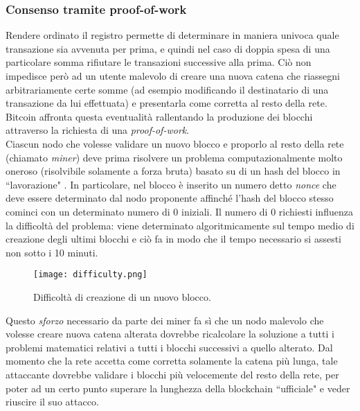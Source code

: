 		\subsubsection{Consenso tramite proof-of-work}
			Rendere ordinato il registro permette di determinare in maniera univoca quale transazione sia avvenuta per prima, e quindi nel caso di doppia spesa di una particolare somma rifiutare le transazioni successive alla prima. Ciò non impedisce però ad un utente malevolo di creare una nuova catena che riassegni arbitrariamente certe somme (ad esempio modificando il destinatario di una transazione da lui effettuata) e presentarla come corretta al resto della rete. Bitcoin affronta questa eventualità rallentando la produzione dei blocchi attraverso la richiesta di una \emph{proof-of-work}. \\
			Ciascun nodo che volesse validare un nuovo blocco e proporlo al resto della rete (chiamato \emph{miner}) deve prima risolvere un problema computazionalmente molto oneroso (risolvibile solamente a forza bruta) basato su di un hash del blocco in ``lavorazione" \cite{hashcash}. In particolare, nel blocco è inserito un numero detto \emph{nonce} che deve essere determinato dal nodo proponente affinché l'hash del blocco stesso cominci con un determinato numero di 0 iniziali. Il numero di 0 richiesti influenza la difficoltà del problema: viene determinato algoritmicamente sul tempo medio di creazione degli ultimi blocchi e ciò fa in modo che il tempo necessario si assesti non sotto i 10 minuti.
			\begin{figure}[ht]
				\centering
				\texttt{[image: difficulty.png]}
				\caption[Difficoltà di creazione di un nuovo blocco]{Difficoltà di creazione di un nuovo blocco.}
				\label{fig:bitcoin_difficulty}
			\end{figure}
			Questo \emph{sforzo} necessario da parte dei miner fa sì che un nodo malevolo che volesse creare nuova catena alterata dovrebbe ricalcolare la soluzione a tutti i problemi matematici relativi a tutti i blocchi successivi a quello alterato. Dal momento che la rete accetta come corretta solamente la catena più lunga, tale attaccante dovrebbe validare i blocchi più velocemente del resto della rete, per poter ad un certo punto superare la lunghezza della blockchain ``ufficiale" e veder riuscire il suo attacco.
